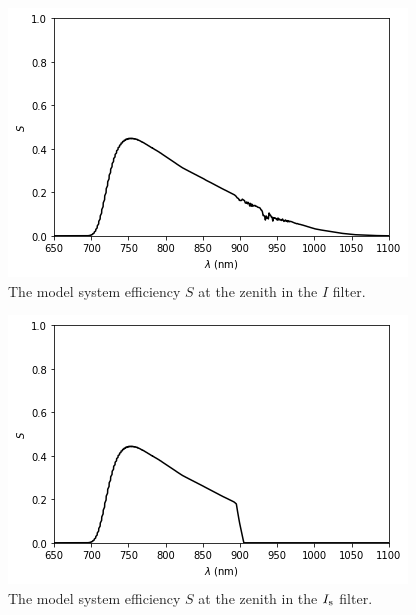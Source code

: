\begin{figure}
\begin{center}
\includegraphics[width=0.9\linewidth]{figures/huitzi-S-JC-I.png}
\medskip
\caption{The model system efficiency $S$ at the zenith in the $I$ filter.}
\end{center}
\end{figure}

\begin{figure}
\begin{center}
\includegraphics[width=0.9\linewidth]{figures/huitzi-S-JC-Is.png}
\medskip
\caption{The model system efficiency $S$ at the zenith in the $\mbox{$I_\mathrm{s}$}$ filter.}
\end{center}
\end{figure}

